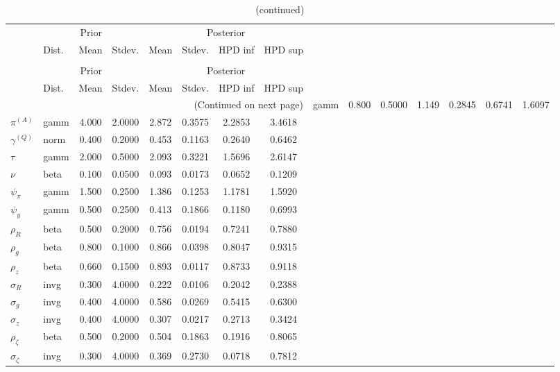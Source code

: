  
\begin{center}
\begin{longtable}{llcccccc} 
\caption{Results from Metropolis-Hastings (parameters)}
 \label{Table:MHPosterior:1}\\
\toprule 
  & \multicolumn{3}{c}{Prior}  &  \multicolumn{4}{c}{Posterior} \\
  \cmidrule(r{.75em}){2-4} \cmidrule(r{.75em}){5-8}
  & Dist. & Mean  & Stdev. & Mean & Stdev. & HPD inf & HPD sup\\
\midrule \endfirsthead 
\caption{(continued)}\\\toprule 
  & \multicolumn{3}{c}{Prior}  &  \multicolumn{4}{c}{Posterior} \\
  \cmidrule(r{.75em}){2-4} \cmidrule(r{.75em}){5-8}
  & Dist. & Mean  & Stdev. & Mean & Stdev. & HPD inf & HPD sup\\
\midrule \endhead 
\bottomrule \multicolumn{8}{r}{(Continued on next page)} \endfoot 
\bottomrule \endlastfoot 
${r_{A}}$ & gamm &   0.800 & 0.5000 &   1.149& 0.2845 &  0.6741 &  1.6097 \\ 
${\pi^{(A)}}$ & gamm &   4.000 & 2.0000 &   2.872& 0.3575 &  2.2853 &  3.4618 \\ 
${\gamma^{(Q)}}$ & norm &   0.400 & 0.2000 &   0.453& 0.1163 &  0.2640 &  0.6462 \\ 
${\tau}$ & gamm &   2.000 & 0.5000 &   2.093& 0.3221 &  1.5696 &  2.6147 \\ 
${\nu}$ & beta &   0.100 & 0.0500 &   0.093& 0.0173 &  0.0652 &  0.1209 \\ 
${\psi_\pi}$ & gamm &   1.500 & 0.2500 &   1.386& 0.1253 &  1.1781 &  1.5920 \\ 
${\psi_y}$ & gamm &   0.500 & 0.2500 &   0.413& 0.1866 &  0.1180 &  0.6993 \\ 
${\rho_R}$ & beta &   0.500 & 0.2000 &   0.756& 0.0194 &  0.7241 &  0.7880 \\ 
${\rho_{g}}$ & beta &   0.800 & 0.1000 &   0.866& 0.0398 &  0.8047 &  0.9315 \\ 
${\rho_z}$ & beta &   0.660 & 0.1500 &   0.893& 0.0117 &  0.8733 &  0.9118 \\ 
${\sigma_R}$ & invg &   0.300 & 4.0000 &   0.222& 0.0106 &  0.2042 &  0.2388 \\ 
${\sigma_{g}}$ & invg &   0.400 & 4.0000 &   0.586& 0.0269 &  0.5415 &  0.6300 \\ 
${\sigma_z}$ & invg &   0.400 & 4.0000 &   0.307& 0.0217 &  0.2713 &  0.3424 \\ 
${\rho_\zeta}$ & beta &   0.500 & 0.2000 &   0.504& 0.1863 &  0.1916 &  0.8065 \\ 
${\sigma_\zeta}$ & invg &   0.300 & 4.0000 &   0.369& 0.2730 &  0.0718 &  0.7812 \\ 
\end{longtable}
 \end{center}
